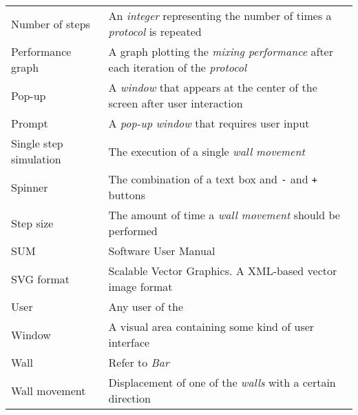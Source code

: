 \begin{tabularx}{\textwidth}{lX}
    Number of steps & An \emph{integer} representing the number of times a \emph{protocol} is repeated \\
    Performance graph & A graph plotting the \emph{mixing performance} after each iteration of the \emph{protocol} \\
    Pop-up & A \emph{window} that appears at the center of the screen after user interaction \\
    Prompt & A \emph{pop-up} \emph{window} that requires user input \\
    Single step simulation & The execution of a single \emph{wall movement} \\
    Spinner & The combination of a text box and \texttt{-} and \texttt{+} buttons \\
    Step size & The amount of time a \emph{wall movement} should be performed \\
    SUM & Software User Manual \\
    SVG format & Scalable Vector Graphics. A XML-based vector image format \\
    User & Any user of the \applicationname{} \\
    Window & A visual area containing some kind of user interface \\
    Wall & Refer to \emph{Bar} \\
    Wall movement & Displacement of one of the \emph{walls} with a certain direction \\
    \bottomrule
\end{tabularx}




